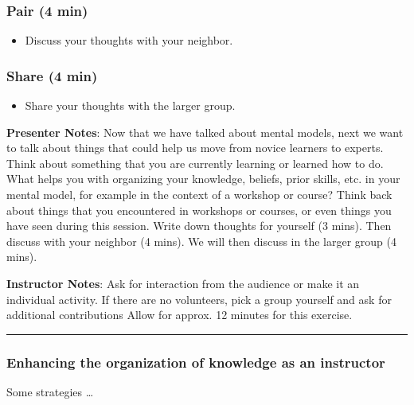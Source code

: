 \documentclass[
  letterpaper,
  DIV=11,
  numbers=noendperiod]{scrartcl}
\providecommand{\tightlist}{%
  \setlength{\itemsep}{0pt}\setlength{\parskip}{0pt}}
\begin{document}
\subsubsection{Pair (4 min)}\label{pair-4-min}

\begin{itemize}
\tightlist
\item
  Discuss your thoughts with your neighbor.
\end{itemize}

\subsubsection{Share (4 min)}\label{share-4-min}

\begin{itemize}
\tightlist
\item
  Share your thoughts with the larger group.
\end{itemize}

\textbf{Presenter Notes}: Now that we have talked about mental models,
next we want to talk about things that could help us move from novice
learners to experts. Think about something that you are currently
learning or learned how to do. What helps you with organizing your
knowledge, beliefs, prior skills, etc. in your mental model, for example
in the context of a workshop or course? Think back about things that you
encountered in workshops or courses, or even things you have seen during
this session. Write down thoughts for yourself (3 mins). Then discuss
with your neighbor (4 mins). We will then discuss in the larger group (4
mins).

\textbf{Instructor Notes}: Ask for interaction from the audience or make
it an individual activity. If there are no volunteers, pick a group
yourself and ask for additional contributions Allow for approx. 12
minutes for this exercise.

\begin{center}\rule{0.5\linewidth}{0.5pt}\end{center}

\subsubsection{Enhancing the organization of knowledge as an
instructor}\label{enhancing-the-organization-of-knowledge-as-an-instructor}

Some strategies \ldots{}
\end{document}
